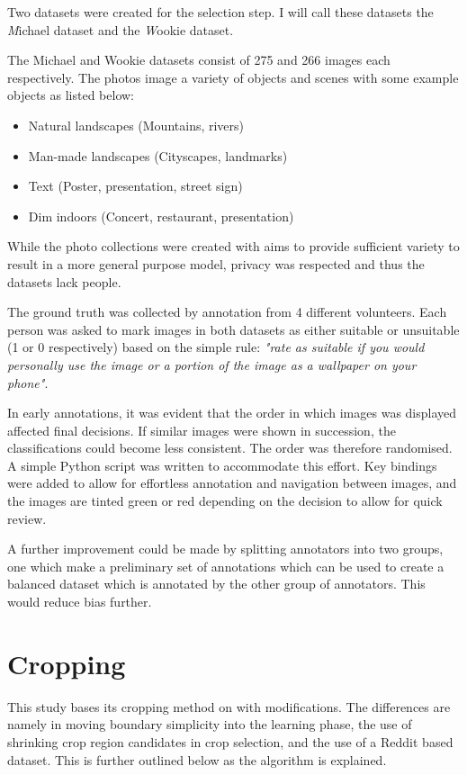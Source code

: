 Two datasets were created for the selection step. I will call these datasets the
\emph Michael dataset and the \emph Wookie dataset.

The Michael and Wookie datasets consist of 275 and 266 images each respectively.
The photos image a variety of objects and scenes with some example objects
as listed below:

\begin{itemize}
\item Natural landscapes (Mountains, rivers)
\item Man-made landscapes (Cityscapes, landmarks)
\item Text (Poster, presentation, street sign)
\item Dim indoors (Concert, restaurant, presentation)
\end{itemize}

While the photo collections were created with aims to provide sufficient variety
to result in a more general purpose model, privacy was respected and thus the
datasets lack people.

The ground truth was collected by annotation from 4 different volunteers.
Each person was asked to mark images in both datasets as either suitable or
unsuitable (1 or 0 respectively) based on the simple rule: \emph{"rate as
suitable if you would personally use the image or a portion of the image as a
wallpaper on your phone"}.

In early annotations, it was evident that the order in which images was
displayed affected final decisions.
If similar images were shown in succession, the classifications could become
less consistent.
The order was therefore randomised.
A simple Python script was written to accommodate this effort.
Key bindings were added to allow for effortless annotation and navigation
between images, and the images are tinted green or red depending on the decision
to allow for quick review.

A further improvement could be made by splitting annotators into two groups, one
which make a preliminary set of annotations which can be used to create a
balanced dataset which is annotated by the other group of annotators.
This would reduce bias further.

\section{Cropping\label{sec:method_cropping}}

This study bases its cropping method on \cite{fang2014automatic} with modifications.
The differences are namely in moving boundary simplicity into the learning phase, the use of shrinking crop region candidates in crop selection, and the use of a Reddit based dataset.
This is further outlined below as the algorithm is explained.

